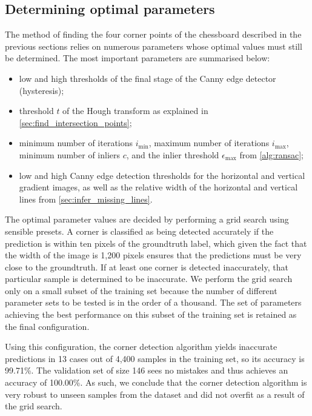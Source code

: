 \documentclass[../main.tex]{subfiles}
\begin{document}
\subsection{Determining optimal parameters}
The method of finding the four corner points of the chessboard described in the previous sections relies on numerous parameters whose optimal values must still be determined.
The most important parameters are summarised below:
\begin{itemize}
    \item low and high thresholds of the final stage of the Canny edge detector (hysteresis);
    \item threshold $t$ of the Hough transform as explained in \cref{sec:find_intersection_points};
    \item minimum number of iterations $i_\text{min}$, maximum number of iterations $i_\text{max}$, minimum number of inliers $c$, and the inlier threshold $\epsilon_\text{max}$ from \cref{alg:ransac};
    \item low and high Canny edge detection thresholds for the horizontal and vertical gradient images, as well as the relative width of the horizontal and vertical lines from \cref{sec:infer_missing_lines}.
\end{itemize}
The optimal parameter values are decided by performing a grid search using sensible presets.
A corner is classified as being detected accurately if the prediction is within ten pixels of the groundtruth label, which given the fact that the width of the image is 1,200 pixels ensures that the predictions must be very close to the groundtruth.
If at least one corner is detected inaccurately, that particular sample is determined to be inaccurate.
We perform the grid search only on a small subset of the training set because the number of different parameter sets to be tested is in the order of a thousand.
The set of parameters achieving the best performance on this subset of the training set is retained as the final configuration.

Using this configuration, the corner detection algorithm yields inaccurate predictions in 13 cases out of 4,400 samples in the training set, so its accuracy is 99.71\%.
The validation set of size 146 sees no mistakes and thus achieves an accuracy of 100.00\%.
As such, we conclude that the corner detection algorithm is very robust to unseen samples from the dataset and did not overfit as a result of the grid search.
\end{document}
